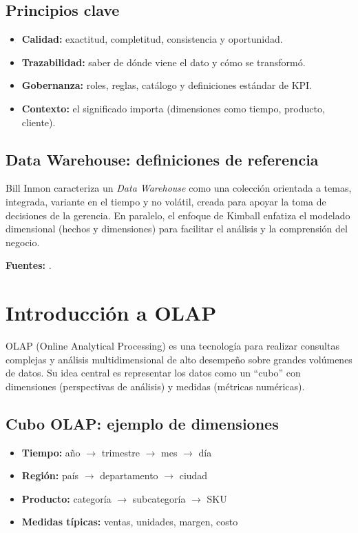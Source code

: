 \documentclass[12pt]{article}
\begin{document}
\subsection*{Principios clave}
\begin{itemize}[leftmargin=*, itemsep=0.25em]
  \item \textbf{Calidad:} exactitud, completitud, consistencia y oportunidad.
  \item \textbf{Trazabilidad:} saber de dónde viene el dato y cómo se transformó.
  \item \textbf{Gobernanza:} roles, reglas, catálogo y definiciones estándar de KPI.
  \item \textbf{Contexto:} el significado importa (dimensiones como tiempo, producto, cliente).
\end{itemize}

\subsection*{Data Warehouse: definiciones de referencia}
Bill Inmon caracteriza un \textit{Data Warehouse} como una colección orientada a temas, integrada, variante en el tiempo y no volátil, creada para apoyar la toma de decisiones de la gerencia. En paralelo, el enfoque de Kimball enfatiza el modelado dimensional (hechos y dimensiones) para facilitar el análisis y la comprensión del negocio.

\noindent\textbf{Fuentes:} \cite{inmon_dataversity, kimball_dwtoolkit}.

\section{Introducción a OLAP}
OLAP (Online Analytical Processing) es una tecnología para realizar consultas complejas y análisis multidimensional de alto desempeño sobre grandes volúmenes de datos. Su idea central es representar los datos como un ``cubo'' con dimensiones (perspectivas de análisis) y medidas (métricas numéricas).

\subsection*{Cubo OLAP: ejemplo de dimensiones}
\begin{itemize}[leftmargin=*, itemsep=0.25em]
  \item \textbf{Tiempo:} año $\rightarrow$ trimestre $\rightarrow$ mes $\rightarrow$ día
  \item \textbf{Región:} país $\rightarrow$ departamento $\rightarrow$ ciudad
  \item \textbf{Producto:} categoría $\rightarrow$ subcategoría $\rightarrow$ SKU
  \item \textbf{Medidas típicas:} ventas, unidades, margen, costo
\end{itemize}
\end{document}
